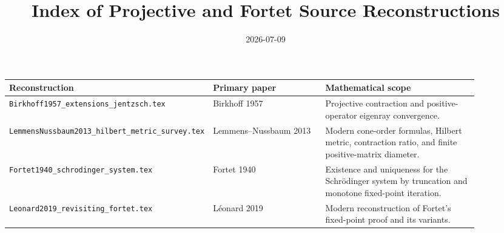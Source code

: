 \documentclass[11pt]{article}
\title{Index of Projective and Fortet Source Reconstructions}
\author{}
\date{2026-07-09}
\begin{document}
\maketitle

\begin{longtable}{p{0.31\linewidth}p{0.25\linewidth}p{0.34\linewidth}}
\toprule
Reconstruction & Primary paper & Mathematical scope \\
\midrule
\texttt{Birkhoff1957\_extensions\_jentzsch.tex} & Birkhoff 1957 & Projective contraction and positive-operator eigenray convergence. \\
\texttt{LemmensNussbaum2013\_hilbert\_metric\_survey.tex} & Lemmens--Nussbaum 2013 & Modern cone-order formulas, Hilbert metric, contraction ratio, and finite positive-matrix diameter. \\
\texttt{Fortet1940\_schrodinger\_system.tex} & Fortet 1940 & Existence and uniqueness for the Schrödinger system by truncation and monotone fixed-point iteration. \\
\texttt{Leonard2019\_revisiting\_fortet.tex} & L\'eonard 2019 & Modern reconstruction of Fortet's fixed-point proof and its variants. \\
\bottomrule
\end{longtable}
\end{document}
